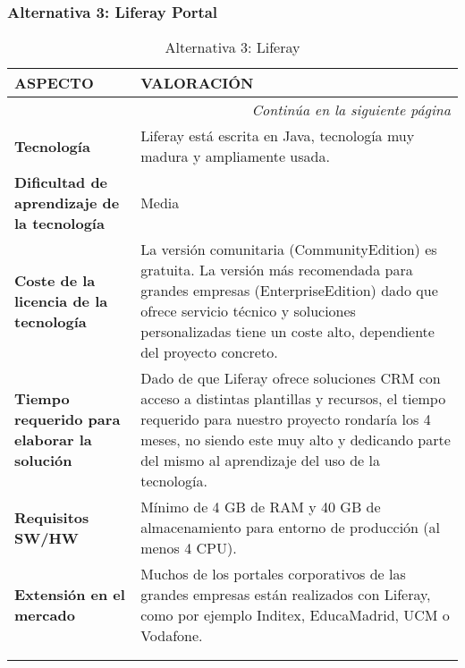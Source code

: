 \subsubsection{Alternativa 3: Liferay Portal}

\begin{center}
\begin{longtable}{p{4cm} p{8cm}}

\textbf{ASPECTO} & \textbf{VALORACIÓN} \\ \hline \hline
\endfirsthead
\endhead

\multicolumn{2}{r}{\textit{Continúa en la siguiente página}} \\
\endfoot
\endlastfoot

\textbf{Tecnología} & Liferay está escrita en Java, tecnología muy madura y ampliamente usada.\\ \hline

\textbf{Dificultad de aprendizaje de la tecnología} & Media\\ \hline

\textbf{Coste de la licencia de la tecnología} &
\par La versión comunitaria (CommunityEdition) es gratuita. La versión más recomendada para grandes empresas (EnterpriseEdition) dado que ofrece servicio técnico y soluciones personalizadas tiene un coste alto, dependiente del proyecto concreto.
\\ \hline

\textbf{Tiempo requerido para elaborar la solución} & Dado de que Liferay ofrece soluciones CRM con acceso a distintas plantillas y recursos, el tiempo requerido para nuestro proyecto rondaría los 4 meses, no siendo este muy alto y dedicando parte del mismo al aprendizaje del uso de la tecnología.\\ \hline

\textbf{Requisitos SW/HW} & Mínimo de 4 GB de RAM y 40 GB de almacenamiento para entorno de producción (al menos 4 CPU).\\ \hline

\textbf{Extensión en el mercado} & Muchos de los portales corporativos de las grandes empresas están realizados con Liferay, como por ejemplo Inditex, EducaMadrid, UCM o Vodafone.\\ \hline \hline


\caption{Alternativa 3: Liferay}\\
\label{tab:alternative3}
\end{longtable}
\end{center}
